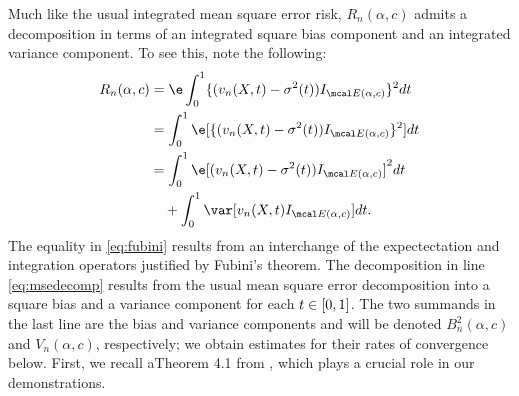 Much like the usual integrated mean square error risk, $R_n(\alpha,c)$ admits a decomposition in terms of an integrated square bias component and an integrated variance component. To see this, note the following:
\begin{align}
  R_n(\alpha, c ) & = \e \int_0^1  \{(\svnx - \sigma^2(t))\indvol\}^2 \D t \\ 
  & = \int_0^1 \e[ \{(\svnx - \sigma^2(t))\indvol\}^2] \D t \label{eq:fubini}\\ 
& = \int_0^1 \e[ (\svnx - \sigma^2(t))\indvol]^2 \D t \notag \\
& \quad + \int_0^1 \var[\svnx\indvol] \D t. \label{eq:msedecomp}
\end{align}
The equality in \eqref{eq:fubini} results from an interchange of the expectectation and integration operators justified by Fubini's theorem. The decomposition in line  \eqref{eq:msedecomp} results from the usual mean square error decomposition  into a square bias and a variance component for each  $t \in [0,1]$. The two summands in the last line are the bias and variance components and will be denoted $B_n^2(\alpha,c)$ and $V_n(\alpha,c)$, respectively; we obtain estimates for their rates of convergence below. First, we recall  aTheorem 4.1 from \cite{Zhang2008}, which plays a crucial role in our demonstrations. 

